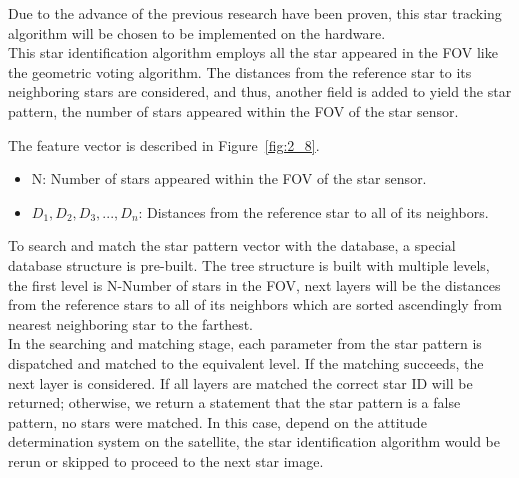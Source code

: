 \noindent Due to the advance of the previous research have been proven, this star tracking algorithm will be chosen to be implemented on the hardware. \\

\noindent This star identification algorithm employs all the star appeared in the FOV like the geometric voting algorithm. The distances from the reference star to its neighboring stars are considered, and thus, another field is added to yield the star pattern, the number of stars appeared within the FOV of the star sensor. \\


\noindent The feature vector is described in Figure~\ref{fig:2_8}.
\begin{center}
	\begin{itemize}
		\item N: Number of stars appeared within the FOV of the star sensor.
		\item $D_1, D_2, D_3, ..., D_n$: Distances from the reference star to all of its neighbors.
	\end{itemize}
\end{center}

\noindent To search and match the star pattern vector with the database, a special database structure is pre-built. The tree structure is built with multiple levels, the first level is N-Number of stars in the FOV, next layers will be the distances from the reference stars to all of its neighbors which are sorted ascendingly from nearest neighboring star to the farthest. \\

\noindent In the searching and matching stage, each parameter from the star pattern is dispatched and matched to the equivalent level. If the matching succeeds, the next layer is considered. If all layers are matched the correct star ID will be returned; otherwise, we return a statement that the star pattern is a false pattern, no stars were matched. In this case, depend on the attitude determination system on the satellite, the star identification algorithm would be rerun or skipped to proceed to the next star image.


